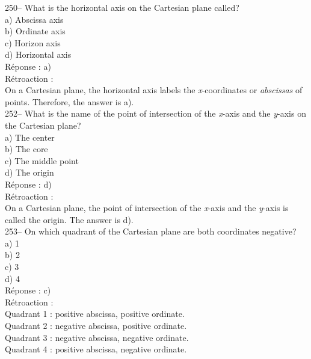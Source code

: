 \documentclass[letterpaper, 12pt]{article}
\begin{document}
250--  What is the horizontal axis on the Cartesian plane called?\\

a) Abscissa axis\\
b) Ordinate axis\\
c) Horizon axis\\
d) Horizontal axis\\

R\'eponse : a)\\

R\'etroaction :\\
On a Cartesian plane, the horizontal axis labels the
\emph{x}-coordinates
or \emph{abscissas }of points. Therefore, the answer is a).\\

252-- What is the name of the point of intersection of the
\emph{x}-axis
and the \emph{y}-axis on the Cartesian plane?\\

a) The center\\
b) The core\\
c) The middle point\\
d) The origin\\

R\'eponse : d)\\

R\'etroaction :\\
On a Cartesian plane, the point of intersection of the \emph{x}-axis
and
the \emph{y}-axis is called the origin. The answer is d).\\

253-- On which quadrant of the Cartesian plane are both coordinates
negative?\\

a) 1\\
b) 2 \\
c) 3\\
d) 4\\

R\'eponse : c)\\

R\'etroaction : \\
Quadrant 1 : positive abscissa, positive ordinate.\\
Quadrant 2 : negative abscissa, positive ordinate.\\
Quadrant 3 : negative abscissa, negative ordinate.\\
Quadrant 4 : positive abscissa, negative ordinate.\\
\end{document}

